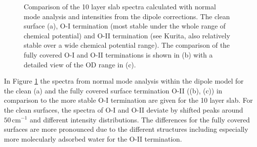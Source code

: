 \documentclass[11pt,DIV=13,BCOR=5mm,a4paper,headinclude]{scrbook}
\begin{document}
\begin{figure}[!h]
 \centering
 \quad
 \quad
 \caption{Comparison of the 10 layer slab spectra calculated with normal mode analysis and intensities from the dipole corrections.
The clean surface (a), O-I termination (most stable under the whole range of chemical potential) and O-II termination (see Kurita\cite{kuri10}, also relatively stable over a wide chemical potential range).
The comparison of the fully covered O-I and O-II terminations is shown in (b) with a detailed view of the OD range in (c).}
 \label{abb:comp_O-I-O-II}
\end{figure}
In Figure \ref{abb:comp_O-I-O-II} the spectra from normal mode analysis within the dipole model for the clean (a) and the fully covered surface termination O-II ((b), (c)) in comparison to the more stable O-I termination are given for the 10 layer slab.
For the clean surfaces, the spectra of O-I and O-II deviate by shifted peaks around $50\,$cm$^{-1}$ and different intensity distributions.
The differences for the fully covered surfaces are more pronounced due to the different structures including especially more molecularly adsorbed water for the O-II termination.
\end{document}
